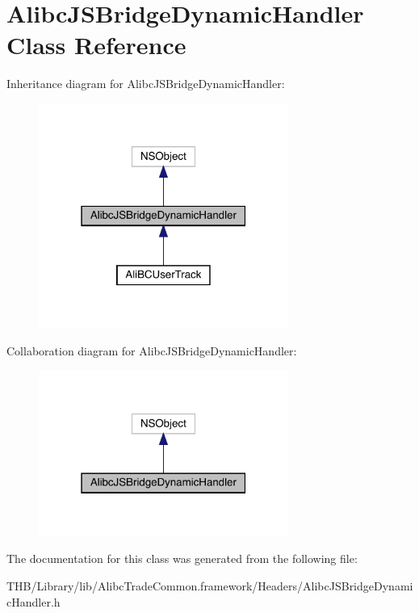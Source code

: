 \hypertarget{interface_alibc_j_s_bridge_dynamic_handler}{}\section{Alibc\+J\+S\+Bridge\+Dynamic\+Handler Class Reference}
\label{interface_alibc_j_s_bridge_dynamic_handler}


Inheritance diagram for Alibc\+J\+S\+Bridge\+Dynamic\+Handler\+:\nopagebreak
\begin{figure}[H]
\begin{center}
\leavevmode
\includegraphics[width=232pt]{interface_alibc_j_s_bridge_dynamic_handler__inherit__graph}
\end{center}
\end{figure}


Collaboration diagram for Alibc\+J\+S\+Bridge\+Dynamic\+Handler\+:\nopagebreak
\begin{figure}[H]
\begin{center}
\leavevmode
\includegraphics[width=232pt]{interface_alibc_j_s_bridge_dynamic_handler__coll__graph}
\end{center}
\end{figure}


The documentation for this class was generated from the following file\+:\begin{DoxyCompactItemize}
\item 
T\+H\+B/\+Library/lib/\+Alibc\+Trade\+Common.\+framework/\+Headers/Alibc\+J\+S\+Bridge\+Dynamic\+Handler.\+h\end{DoxyCompactItemize}

